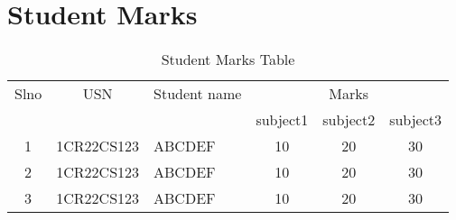 \documentclass{article}
\begin{document}
\section*{Student Marks}

\begin{table}
    \centering
    \caption{Student Marks Table}
    \label{student-marks}
    \begin{tabularx}{\textwidth}{|c|c|X|c|c|c|}
    \hline
    Slno & USN & Student name & \multicolumn{3}{c|}{Marks}\\
    \cline{4-6}
    &&& subject1 & subject2 & subject3\\
    \hline
    1 & 1CR22CS123 & ABCDEF & 10 & 20 & 30\\
    \hline
    2 & 1CR22CS123 & ABCDEF & 10 & 20 & 30\\
    \hline
    3 & 1CR22CS123 & ABCDEF & 10 & 20 & 30\\
    \hline
        
    \end{tabularx}
\end{table}
\end{document}
